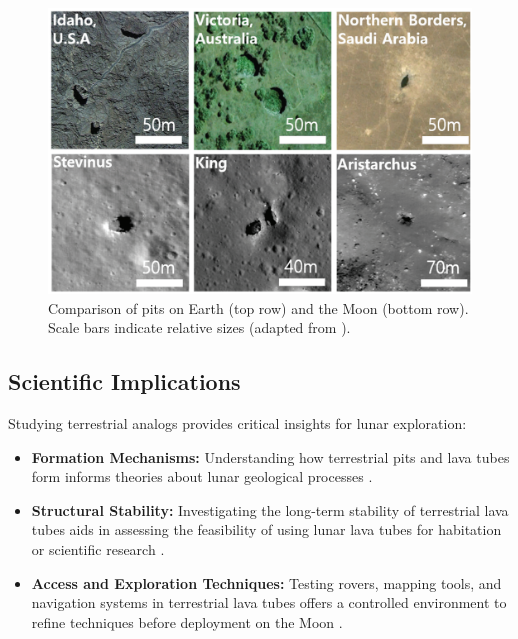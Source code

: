 \begin{figure}[H]
    \centering
    \includegraphics[width=0.8\linewidth]{terrestrial-vs-lunar-pits.png}
    \caption{Comparison of pits on Earth (top row) and the Moon (bottom row). Scale bars indicate relative sizes (adapted from \cite{lunar-pits-entrances-to-caves}).}
    \label{fig:earth-moon-pits}
\end{figure}

\subsection{Scientific Implications}

Studying terrestrial analogs provides critical insights for lunar exploration:
\begin{itemize}
    \item \textbf{Formation Mechanisms:} Understanding how terrestrial pits and lava tubes form informs theories about lunar geological processes \cite{sublunear-lava, radar-observations-lava-tubes}.
    \item \textbf{Structural Stability:} Investigating the long-term stability of terrestrial lava tubes aids in assessing the feasibility of using lunar lava tubes for habitation or scientific research \cite{bases-feng}.
    \item \textbf{Access and Exploration Techniques:} Testing rovers, mapping tools, and navigation systems in terrestrial lava tubes offers a controlled environment to refine techniques before deployment on the Moon \cite{kerber2023, esa-daedalus}.
\end{itemize}